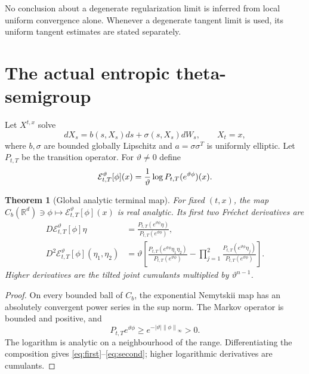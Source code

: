 \documentclass[11pt,reqno]{amsart}
\newtheorem{theorem}{Theorem}[section]
\theoremstyle{definition}
\theoremstyle{remark}
\newcommand{\R}{\mathbb R}
\newcommand{\cE}{\mathcal E}
\newcommand{\norm}[1]{\left\lVert #1\right\rVert}
\newcommand{\abs}[1]{\left\lvert #1\right\rvert}
\begin{document}
No conclusion about a degenerate regularization limit is inferred from local
uniform convergence alone.  Whenever a degenerate tangent limit is used, its
uniform tangent estimates are stated separately.

\section{The actual entropic theta-semigroup}

Let $X^{t,x}$ solve
\begin{equation}\label{eq:forward}
 dX_s=b(s,X_s)ds+\sigma(s,X_s)dW_s,
 \qquad X_t=x,
\end{equation}
where $b,\sigma$ are bounded globally Lipschitz and
$a=\sigma\sigma^T$ is uniformly elliptic.  Let $P_{t,T}$ be the transition
operator.  For $\vartheta\ne0$ define
\begin{equation}\label{eq:theta}
 \cE_{t,T}^{\vartheta}[\phi](x)
 ={1\over\vartheta}\log P_{t,T}(e^{\vartheta\phi})(x).
\end{equation}

\begin{theorem}[Global analytic terminal map]\label{thm:analytic}
For fixed $(t,x)$, the map
$C_b(\R^d)\ni\phi\mapsto\cE_{t,T}^{\vartheta}[\phi](x)$ is real analytic.
Its first two Fr\'echet derivatives are
\begin{align}
 D\cE_{t,T}^{\vartheta}[\phi]\eta
 &=\frac{P_{t,T}(e^{\vartheta\phi}\eta)}
        {P_{t,T}(e^{\vartheta\phi})},\label{eq:first}\\
 D^2\cE_{t,T}^{\vartheta}[\phi](\eta_1,\eta_2)
 &=\vartheta\left[
 \frac{P_{t,T}(e^{\vartheta\phi}\eta_1\eta_2)}
      {P_{t,T}(e^{\vartheta\phi})}
 -\prod_{j=1}^2
 \frac{P_{t,T}(e^{\vartheta\phi}\eta_j)}
      {P_{t,T}(e^{\vartheta\phi})}
 \right].\label{eq:second}
\end{align}
Higher derivatives are the tilted joint cumulants multiplied by
$\vartheta^{n-1}$.
\end{theorem}

\begin{proof}
On every bounded ball of $C_b$, the exponential Nemytskii map has an
absolutely convergent power series in the sup norm.  The Markov operator is
bounded and positive, and
\[
 P_{t,T}e^{\vartheta\phi}
 \ge e^{-\abs\vartheta\norm\phi_\infty}>0.
\]
The logarithm is analytic on a neighbourhood of the range.  Differentiating
the composition gives \eqref{eq:first}--\eqref{eq:second}; higher logarithmic
derivatives are cumulants.
\end{proof}
\end{document}

